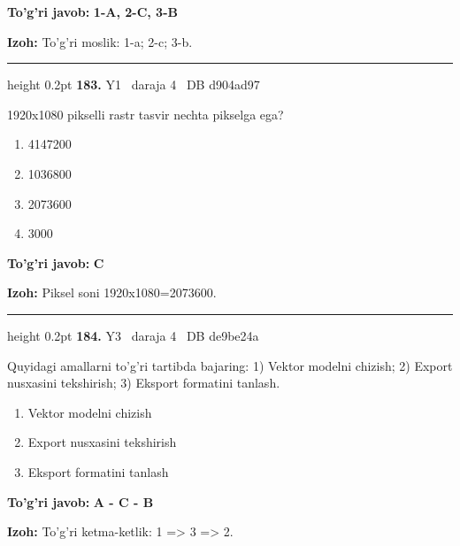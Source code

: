 \documentclass[10pt,a4paper,oneside]{article}
\begin{document}
\begin{tcolorbox}[enhanced,breakable,colback=teal!4,colframe=teal!45!black,boxrule=0.45pt,arc=1.2mm,left=2.8mm,right=2.8mm,top=2mm,bottom=2mm,before skip=2mm,after skip=2mm]
\textbf{\color{teal}To'g'ri javob:} \textbf{1-A, 2-C, 3-B}
\par\smallskip
\textbf{Izoh:} To'g'ri moslik: 1-a; 2-c; 3-b.
\end{tcolorbox}
\vspace{2mm}\hrule height 0.2pt \vspace{4mm}
\hypertarget{q183}{\textbf{\color{ink}183.}}  {\color{muted}\scriptsize Y1 \textbullet\ daraja 4 \textbullet\ DB d904ad97}
\par
1920x1080 pikselli rastr tasvir nechta pikselga ega?
\begin{enumerate}[label=\Alph*),leftmargin=9mm]
\item 4147200
\item 1036800
\item 2073600
\item 3000
\end{enumerate}
\begin{tcolorbox}[enhanced,breakable,colback=teal!4,colframe=teal!45!black,boxrule=0.45pt,arc=1.2mm,left=2.8mm,right=2.8mm,top=2mm,bottom=2mm,before skip=2mm,after skip=2mm]
\textbf{\color{teal}To'g'ri javob:} \textbf{C}
\par\smallskip
\textbf{Izoh:} Piksel soni 1920x1080=2073600.
\end{tcolorbox}
\vspace{2mm}\hrule height 0.2pt \vspace{4mm}
\hypertarget{q184}{\textbf{\color{ink}184.}}  {\color{muted}\scriptsize Y3 \textbullet\ daraja 4 \textbullet\ DB de9be24a}
\par
Quyidagi amallarni to'g'ri tartibda bajaring: 1) Vektor modelni chizish; 2) Export nusxasini tekshirish; 3) Eksport formatini tanlash.
\begin{enumerate}[label=\Alph*),leftmargin=9mm]
\item Vektor modelni chizish
\item Export nusxasini tekshirish
\item Eksport formatini tanlash
\end{enumerate}
\begin{tcolorbox}[enhanced,breakable,colback=teal!4,colframe=teal!45!black,boxrule=0.45pt,arc=1.2mm,left=2.8mm,right=2.8mm,top=2mm,bottom=2mm,before skip=2mm,after skip=2mm]
\textbf{\color{teal}To'g'ri javob:} \textbf{A - C - B}
\par\smallskip
\textbf{Izoh:} To'g'ri ketma-ketlik: 1 =\textgreater{} 3 =\textgreater{} 2.
\end{tcolorbox}
\end{document}
